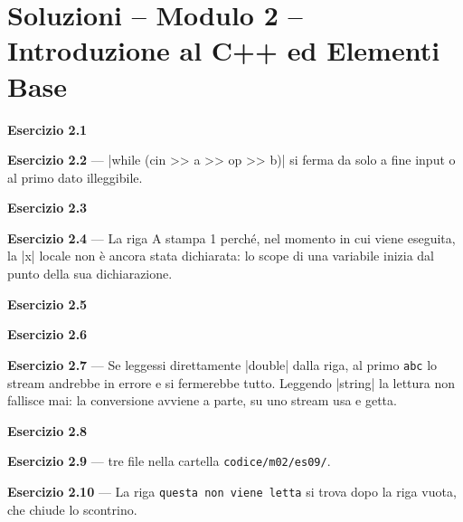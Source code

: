 \chapter{Soluzioni -- Modulo 2 -- Introduzione al C++ ed Elementi Base}
\textbf{Esercizio 2.1}

\textbf{Esercizio 2.2} --- \cc|while (cin >> a >> op >> b)| si ferma da solo a
fine input o al primo dato illeggibile.

\textbf{Esercizio 2.3}

\textbf{Esercizio 2.4} --- La riga A stampa 1 perché, nel momento in cui viene
eseguita, la \cc|x| locale non è ancora stata dichiarata: lo scope di una
variabile inizia dal punto della sua dichiarazione.

\textbf{Esercizio 2.5}

\textbf{Esercizio 2.6}

\textbf{Esercizio 2.7} --- Se leggessi direttamente \cc|double| dalla riga, al
primo \texttt{abc} lo stream andrebbe in errore e si fermerebbe tutto. Leggendo
\cc|string| la lettura non fallisce mai: la conversione avviene a parte, su uno
stream usa e getta.

\textbf{Esercizio 2.8}

\textbf{Esercizio 2.9} --- tre file nella cartella \texttt{codice/m02/es09/}.

\textbf{Esercizio 2.10} --- La riga \texttt{questa non viene letta} si trova dopo
la riga vuota, che chiude lo scontrino.
